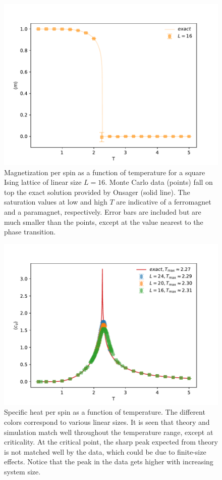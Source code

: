 \documentclass[12pt]{article}
\begin{document}
\begin{figure}[h]
\begin{center}
\includegraphics[width=0.7\columnwidth]{../Figures/b_m_per_spin}
\end{center}
\caption{Magnetization per spin as a function of temperature for a square Ising lattice of linear size $L=16$. Monte Carlo data (points) fall on top the exact solution provided by Onsager (solid line). The saturation values at low and high $T$ are indicative of a ferromagnet and a paramagnet, respectively. Error bars are included but are much smaller than the points, except at the value nearest to the phase transition.}
\label{fig:internal_magnetization}
\end{figure}

\begin{figure}[h]
\begin{center}
\includegraphics[width=0.7\columnwidth]{../Figures/c_specific_heat}
\end{center}
\caption{Specific heat per spin as a function of temperature. The different colors correspond to various linear sizes. It is seen that theory and simulation match well throughout the temperature range, except at criticality. At the critical point, the sharp peak expected from theory is not matched well by the data, which could be due to finite-size effects. Notice that the peak in the data gets higher with increasing system size.}
\label{fig:cv_vs_T}
\end{figure}
\end{document}
